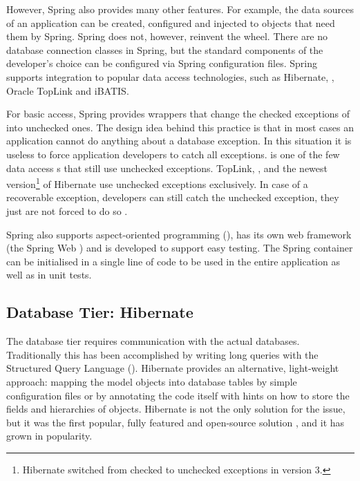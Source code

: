 However, Spring also provides many other features. For example, the 
 data sources of an application can be created, 
configured and injected to objects that need them by Spring. Spring 
does not, however, reinvent the wheel. There are no database 
connection classes in Spring, but the standard components of the 
developer's choice can be configured via Spring configuration files. 
Spring supports integration to popular data access technologies, such 
as Hibernate, , Oracle TopLink and iBATIS.

For basic  access, Spring provides wrappers that change 
the checked exceptions of  into unchecked ones. The 
design idea behind this practice is that in most cases an application 
cannot do anything about a database exception. In this situation it is 
useless to force application developers to catch all exceptions. 
 is one of the few data access s that still 
use unchecked exceptions. TopLink, , and the newest 
version\footnote{Hibernate switched from checked to unchecked 
exceptions in version 3.} of Hibernate use unchecked exceptions 
exclusively. In case of a recoverable exception, developers can still 
catch the unchecked exception, they just are not forced to do so 
\citep{springintro}.

Spring also supports aspect-oriented programming (), has 
its own web framework (the Spring Web ) and is developed 
to support easy testing. The Spring container can be initialised in a 
single line of code to be used in the entire application as well as in 
unit tests.


\subsection{Database Tier: Hibernate}
\label{toc:oss:selected:hibernate}

The database tier requires communication with the actual databases. 
Traditionally this has been accomplished by writing long queries with 
the Structured Query Language (). Hibernate 
\citep{hibernate} provides an alternative, light-weight approach: 
mapping the model objects into database tables by simple configuration 
files or by annotating the code itself with hints on how to store the 
fields and hierarchies of objects. Hibernate is not the only solution 
for the  issue, but it was the first popular, fully 
featured and open-source solution \citep{j2eeframeworks}, and it has 
grown in popularity.

